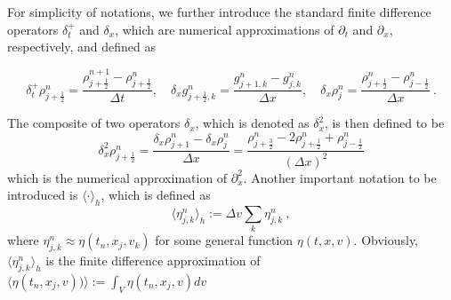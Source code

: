 \documentclass[11pt,twoside]{article}
\theoremstyle{nonumberplain}
\begin{document}
For simplicity of notations, we further introduce the standard finite difference operators $\delta_t^+$ and $\delta_x$, which are numerical approximations of $\partial_t$ and $\partial_x$, respectively, and defined as 

$$\delta_t^+\rho_{j+\frac{1}{2}}^n=\frac{\rho_{j+\frac{1}{2}}^{n+1}-\rho_{j+\frac{1}{2}}^n}{\Delta t}, \quad\delta_xg_{j+\frac{1}{2},k}^n=\frac{g_{j+1,k}^n-g_{j,k}^n}{\Delta x},\quad \delta_x\rho_{j}^n=\frac{\rho_{j+\frac12}^n-\rho_{j-\frac12}^n}{\Delta x}\ .$$

The composite of two operators $\delta_x$, which is denoted as $\delta_x^2$, is then defined to be 
$$
\delta_x^2\rho_{j+\frac{1}{2}}^n=\frac{\delta_ x\rho_{j+1}^n-\delta_x\rho_{j}^n}{\Delta x}=\frac{\rho_{j+\frac{3}{2}}^n-2\rho_{j+\frac{1}{2}}^n+\rho_{j-\frac{1}{2}}^n}{(\Delta x)^2}
$$
which is the numerical approximation of $\partial_x^2$. Another important notation to be introduced is $\langle \cdot \rangle_h$, which is defined as
$$
\langle \eta_{j,k}^n \rangle_h:=\Delta v\sum_k\eta_{j,k}^n\ ,
$$
where $\eta_{j,k}^n\approx \eta(t_n,x_j,v_k)$ for some general function $\eta(t,x,v)$. Obviously, $\langle \eta_{j,k}^n \rangle_h$ is the finite difference approximation of $\langle \eta(t_n,x_j,v))\rangle:=\int_V \eta(t_n,x_j,v) dv$

 
\end{document}
